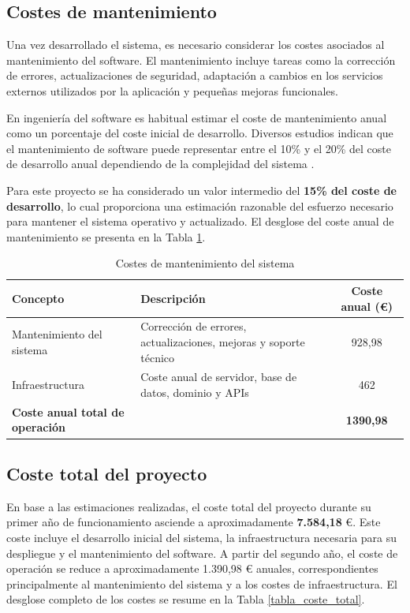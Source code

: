 \subsection{Costes de mantenimiento}

Una vez desarrollado el sistema, es necesario considerar los costes asociados al mantenimiento del software. El mantenimiento incluye tareas como la corrección de errores, actualizaciones de seguridad, adaptación a cambios en los servicios externos utilizados por la aplicación y pequeñas mejoras funcionales.

En ingeniería del software es habitual estimar el coste de mantenimiento anual como un porcentaje del coste inicial de desarrollo. Diversos estudios indican que el mantenimiento de software puede representar entre el 10\% y el 20\% del coste de desarrollo anual dependiendo de la complejidad del sistema \cite{pressman2014software}.

Para este proyecto se ha considerado un valor intermedio del \textbf{15\% del coste de desarrollo}, lo cual proporciona una estimación razonable del esfuerzo necesario para mantener el sistema operativo y actualizado. El desglose del coste anual de mantenimiento se presenta en la Tabla \ref{tabla_coste_mantenimiento}.


\begin{table}[H]
\centering
\caption{Costes de mantenimiento del sistema}
\label{tabla_coste_mantenimiento}
\begin{tabular}{|p{6cm}|p{6cm}|c|}
\hline
\textbf{Concepto} & \textbf{Descripción} & \textbf{Coste anual (€)} \\ \hline

Mantenimiento del sistema &
Corrección de errores, actualizaciones, mejoras y soporte técnico &
928,98 \\ \hline

Infraestructura &
Coste anual de servidor, base de datos, dominio y APIs &
462 \\ \hline

\textbf{Coste anual total de operación} & & \textbf{1390,98} \\ \hline

\end{tabular}
\end{table}

\subsection{Coste total del proyecto}
En base a las estimaciones realizadas, el coste total del proyecto durante su primer año de funcionamiento asciende a aproximadamente \textbf{7.584,18} €. Este coste incluye el desarrollo inicial del sistema, la infraestructura necesaria para su despliegue y el mantenimiento del software. A partir del segundo año, el coste de operación se reduce a aproximadamente 1.390,98 € anuales, correspondientes principalmente al mantenimiento del sistema y a los costes de infraestructura. El desglose completo de los costes se resume en la Tabla \ref{tabla_coste_total}.

